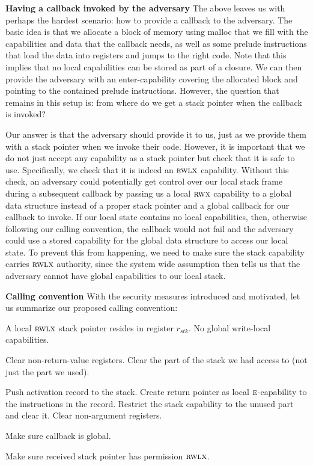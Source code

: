\documentclass[format=acmsmall, review=false, screen=true]{acmart}
\newcommand{\var}[1]{\mathit{#1}}
\newcommand{\stk}{\var{stk}}
\newcommand{\plainperm}[1]{\textsc{#1}}
\newcommand{\entry}{\plainperm{e}}
\newcommand{\rwx}{\plainperm{rwx}}
\newcommand{\rwlx}{\plainperm{rwlx}}
\begin{document}
\textbf{Having a callback invoked by the adversary} The above leaves us with
perhaps the hardest scenario: how to provide a callback to the adversary. The
basic idea is that we allocate a block of memory using malloc that we fill with
the capabilities and data that the callback needs, as well as some
prelude instructions that load the data into registers and jumps to the right
code. Note that this implies that no local capabilities can be stored as part of
a closure. We can then provide the adversary with an enter-capability covering
the allocated block and pointing to the contained prelude instructions. However,
the question that remains in this setup is: from where do we get a stack pointer when
the callback is invoked?

Our answer is that the adversary should provide it to us, just as we provide
them with a stack pointer when we invoke their code. However, it is important
that we do not just accept any capability as a stack pointer but check that it
is safe to use. Specifically, we check that it is indeed an $\rwlx$ capability. Without
this check, an adversary could potentially get control over our local stack
frame during a subsequent callback by passing us a local $\rwx$ capability to a global data
structure instead of a proper stack pointer
and a global callback for our callback to invoke. If our local state contains no
local capabilities, then, otherwise following our calling convention, the callback would
not fail and the adversary could use a stored capability for the global data
structure to access our local state. To prevent this from happening, we need to
make sure the stack capability carries $\rwlx$ authority, since the system wide assumption then
tells us that the adversary cannot have global capabilities to our local stack.

\textbf{Calling convention} With the security measures introduced and motivated,
let us summarize our proposed calling convention:
\begin{description}[font=\normalfont\itshape]
\item[At program start-up] A
local $\rwlx$ stack pointer resides in register $r_\stk$. No global write-local capabilities.
\item[Before returning to the adversary] Clear non-return-value
registers. Clear the part of the stack we had access to (not just the part we used).
\item[Before invoking the adversary] Push activation record to the
stack. Create return pointer as local $\entry$-capability to the instructions in
the record.  Restrict the stack capability to the unused part and clear
it. Clear non-argument registers.
\item[Before invoking an adversary callback] Make sure callback is global.
  \item[When invoked by an adversary] Make sure received stack pointer has permission $\rwlx$.
\end{description}
\end{document}
